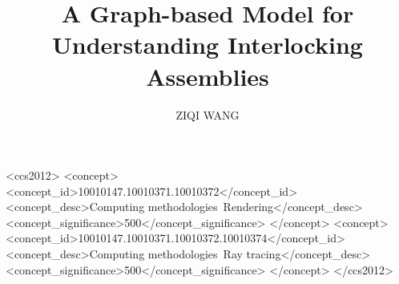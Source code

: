 \documentclass[acmtog]{acmart}
\begin{document}
\title{A Graph-based Model for Understanding Interlocking Assemblies}



\author{ZIQI WANG}





 


\begin{CCSXML}
<ccs2012>
<concept>
<concept_id>10010147.10010371.10010372</concept_id>
<concept_desc>Computing methodologies~Rendering</concept_desc>
<concept_significance>500</concept_significance>
</concept>
<concept>
<concept_id>10010147.10010371.10010372.10010374</concept_id>
<concept_desc>Computing methodologies~Ray tracing</concept_desc>
<concept_significance>500</concept_significance>
</concept>
</ccs2012>
\end{CCSXML}


\fi
 

\maketitle
\end{document}

